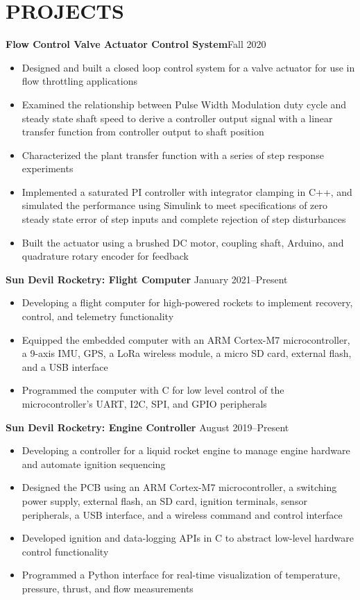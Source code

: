 \documentclass{article}
\begin{document}
\section{PROJECTS}
\textbf{Flow Control Valve Actuator Control System}\hfill Fall 2020
\vspace{0.5em}
\begin{itemize}
	\item Designed and built a closed loop control system for a valve actuator for use in flow throttling applications
	\item Examined the relationship between Pulse Width Modulation duty cycle and steady state shaft speed to derive a controller output signal with a linear transfer function from controller output to shaft position  
	\item Characterized the plant transfer function with a series of step response experiments
	\item  Implemented a saturated PI controller with integrator clamping in C++, and simulated the performance using Simulink to meet specifications of zero steady state error of step inputs and complete rejection of step disturbances
	\item  Built the actuator using a brushed DC motor, coupling shaft, Arduino, and quadrature rotary encoder for feedback
\end{itemize}
\vspace{0.5em}
\textbf{Sun Devil Rocketry: Flight Computer}
\hfill
\vspace{0.5em}
January 2021--Present
\begin{itemize}
\item{Developing a flight computer for high-powered rockets to implement recovery, control, and telemetry functionality}
\item{Equipped the embedded computer with an ARM Cortex-M7 microcontroller, a 9-axis IMU, GPS, a LoRa wireless module, a micro SD card, external flash, and a USB interface}
\item{Programmed the computer with C for low level control of the microcontroller's UART, I2C, SPI, and GPIO peripherals}
\end{itemize}
\vspace{1em}
\textbf{Sun Devil Rocketry: Engine Controller}
\hfill
\vspace{0.5em}
August 2019--Present
\begin{itemize}
\item{Developing a controller for a liquid rocket engine to manage engine hardware and automate ignition sequencing}
\item{Designed the PCB using an ARM Cortex-M7 microcontroller, a switching power supply, external flash, an SD card, ignition terminals, sensor peripherals, a USB interface, and a wireless command and control interface}
\item{Developed ignition and data-logging APIs in C to abstract low-level hardware control functionality}
\item{Programmed a Python interface for real-time visualization of temperature, pressure, thrust, and flow measurements}
\end{itemize}
\vspace{1em}
\thispagestyle{empty}
\end{document}
